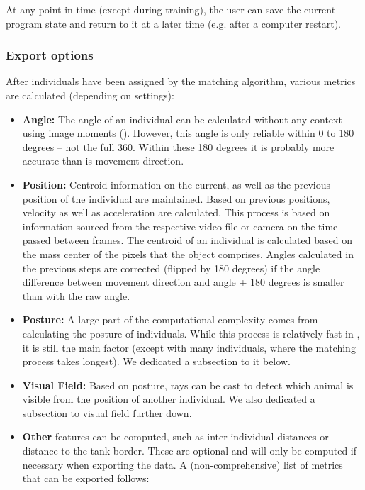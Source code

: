 \documentclass[9pt,lineno]{elife}
\newcommand{\TRex}{\protect\path{TRex}}
\begin{document}
\begin{appendixbox}
At any point in time (except during training), the user can save the current program state and return to it at a later time (e.g. after a computer restart).

\subsubsection{Export options}

After individuals have been assigned by the matching algorithm, various metrics are calculated (depending on settings):

\begin{itemize}
    \item \textbf{Angle:} The angle of an individual can be calculated without any context using image moments (\cite{hu1962visual}). However, this angle is only reliable within 0 to 180 degrees -- not the full 360. Within these 180 degrees it is probably more accurate than is movement direction.
    \item \textbf{Position:} Centroid information on the current, as well as the previous position of the individual are maintained. Based on previous positions, velocity as well as acceleration are calculated. This process is based on information sourced from the respective video file or camera on the time passed between frames. The centroid of an individual is calculated based on the mass center of the pixels that the object comprises. Angles calculated in the previous steps are corrected (flipped by 180 degrees) if the angle difference between movement direction and angle + 180 degrees is smaller than with the raw angle. \item \textbf{Posture:} A large part of the computational complexity comes from calculating the posture of individuals. While this process is relatively fast in \TRex{}, it is still the main factor (except with many individuals, where the matching process takes longest). We dedicated a subsection to it below.
    \item \textbf{Visual Field:} Based on posture, rays can be cast to detect which animal is visible from the position of another individual. We also dedicated a subsection to visual field further down.
    \item \textbf{Other} features can be computed, such as inter-individual distances or distance to the tank border. These are optional and will only be computed if necessary when exporting the data. A (non-comprehensive) list of metrics that can be exported follows:
        \begin{itemize}

\end{itemize}
\end{itemize}
\end{appendixbox}
\end{document}
